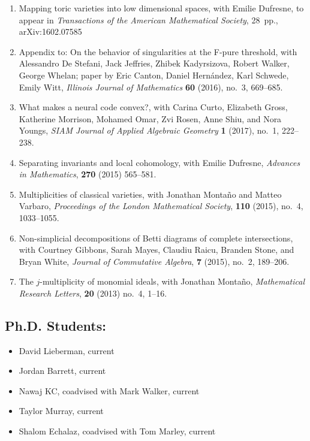 \documentclass[12pt]{amsart}
\begin{document}
\begin{enumerate}[leftmargin=9mm]
\item Mapping toric varieties into low dimensional spaces, with Emilie Dufresne, to appear in \emph{Transactions of the American Mathematical Society}, 28~pp., arXiv:1602.07585
\item Appendix to: On the behavior of singularities at the F-pure threshold, with Alessandro De Stefani, Jack Jeffries, Zhibek Kadyrsizova, Robert Walker, George Whelan; paper by Eric Canton, Daniel Hern\'andez, Karl Schwede, Emily Witt, \emph{Illinois Journal of Mathematics} \textbf{60} (2016), no.~3, 669--685.
\item What makes a neural code convex?, with Carina Curto, Elizabeth Gross, Katherine Morrison, Mohamed Omar, Zvi Rosen, Anne Shiu, and Nora Youngs, \emph{SIAM Journal of Applied Algebraic Geometry} \textbf{1} (2017), no.~1, 222--238.
\item Separating invariants and local cohomology, with Emilie Dufresne, \emph{Advances in Mathematics}, \textbf{270} (2015) 565--581.
\item \sloppy Multiplicities of classical varieties, with Jonathan Monta\~no and Matteo Varbaro, \emph{Proceedings of the London Mathematical Society}, {\bf 110} (2015), no.~4, 1033--1055.
\item Non-simplicial decompositions of Betti diagrams of complete intersections, with Courtney Gibbons, Sarah Mayes, Claudiu Raicu, Branden Stone, and Bryan White, \emph{Journal of Commutative Algebra}, \textbf{7} (2015), no.~2, 189--206.
\item The $j$-multiplicity of monomial ideals, with Jonathan Monta\~no, \emph{Mathematical Research Letters}, {\bf 20} (2013) no.~4, 1--16.



\end{enumerate}



\subsection*{Ph.D. Students:}
\begin{itemize}[leftmargin=9mm]
	\item David Lieberman, current
	\item Jordan Barrett, current
	\item Nawaj KC, coadvised with Mark Walker, current
	\item Taylor Murray, current
	\item Shalom Echalaz, coadvised with Tom Marley, current
	\end{itemize}
\end{document}
